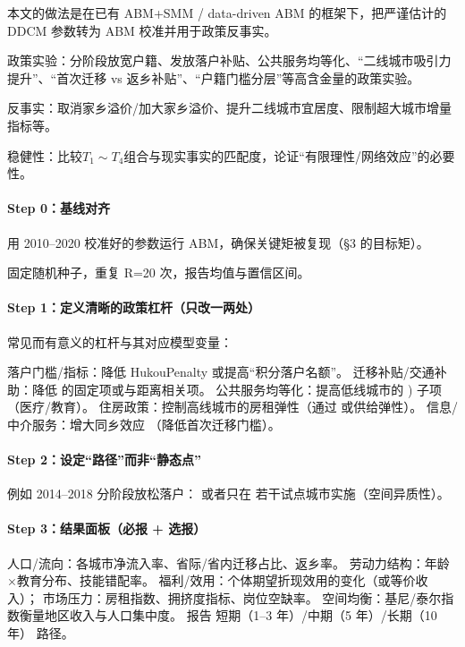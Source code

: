 \documentclass[
  a4paper,
  zihao=-4,
  fontset=mac,
  AutoFakeBold,
  AutoFakeSlant,
  oneside]{ctexbook}
\begin{document}
本文的做法是在已有 ABM+SMM / data-driven ABM 的框架下，把严谨估计的 DDCM 参数转为 ABM 校准并用于政策反事实。



政策实验：分阶段放宽户籍、发放落户补贴、公共服务均等化、“二线城市吸引力提升”、“首次迁移 vs 返乡补贴”、“户籍门槛分层”等高含金量的政策实验。

反事实：取消家乡溢价/加大家乡溢价、提升二线城市宜居度、限制超大城市增量指标等。

稳健性：比较$T_1\sim T_4$组合与现实事实的匹配度，论证“有限理性/网络效应”的必要性。



\paragraph{Step 0：基线对齐}

用 2010–2020 校准好的参数运行 ABM，确保关键矩被复现（§3 的目标矩）。

固定随机种子，重复 
R=20 次，报告均值与置信区间。

\paragraph{Step 1：定义清晰的政策杠杆（只改一两处）}

常见而有意义的杠杆与其对应模型变量：

落户门槛/指标：降低 
HukouPenalty 或提高“积分落户名额”。
迁移补贴/交通补助：降低 
的固定项或与距离相关项。
公共服务均等化：提高低线城市的 ) 子项（医疗/教育）。
住房政策：控制高线城市的房租弹性（通过  或供给弹性）。
信息/中介服务：增大同乡效应 （降低首次迁移门槛）。

\paragraph{Step 2：设定“路径”而非“静态点”}

例如 2014–2018 分阶段放松落户：
或者只在 若干试点城市实施（空间异质性）。

\paragraph{Step 3：结果面板（必报 + 选报）}

人口/流向：各城市净流入率、省际/省内迁移占比、返乡率。
劳动力结构：年龄×教育分布、技能错配率。
福利/效用：个体期望折现效用的变化（或等价收入）；
市场压力：房租指数、拥挤度指标、岗位空缺率。
空间均衡：基尼/泰尔指数衡量地区收入与人口集中度。
报告 短期（1–3 年）/中期（5 年）/长期（10 年） 路径。
\end{document}

